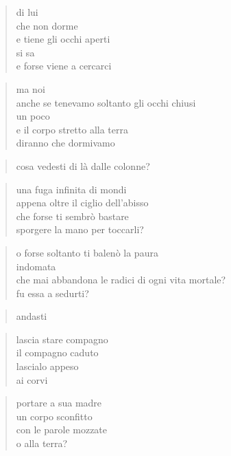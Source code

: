 \begin{verse}
    di lui\\
    che non dorme\\
    e tiene gli occhi aperti\\
    si sa\\
    e forse viene a cercarci
\end{verse}

\begin{verse}
    ma noi\\
    anche se tenevamo soltanto gli occhi chiusi\\
    un poco\\
    e il corpo stretto alla terra\\
    diranno che dormivamo
\end{verse}

\clearpage


\begin{verse}
    cosa vedesti di là dalle colonne?
\end{verse}

\begin{verse}
    una fuga infinita di mondi\\
    appena oltre il ciglio dell'abisso\\
    che forse ti sembrò bastare\\
    sporgere la mano per toccarli?
\end{verse}

\begin{verse}
    o forse soltanto ti balenò la paura\\
    indomata\\
    che mai abbandona le radici di ogni vita mortale?\\
    fu essa a sedurti?
\end{verse}

\begin{verse}
    andasti
\end{verse}

\clearpage


\begin{verse}
    lascia stare compagno\\
    il compagno caduto\\
    lascialo appeso\\
    ai corvi
\end{verse}

\begin{verse}
    portare a sua madre\\
    un corpo sconfitto\\
    con le parole mozzate\\
    o alla terra?
\end{verse}

